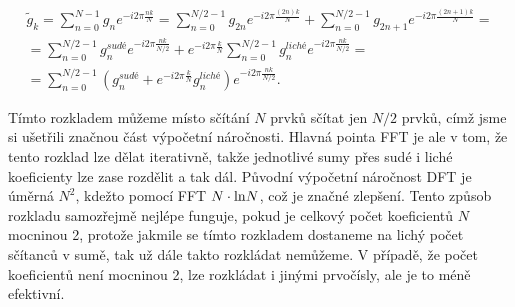 \begin{equation}
\begin{aligned}
\widetilde{g}_k = \sum_{n=0}^{N-1} g_n e^{-i 2 \pi \frac{n k}{N}} = \sum_{n=0}^{N/2-1} g_{2n} e^{-i 2 \pi \frac{(2n) k}{N}} + \sum_{n=0}^{N/2-1} g_{2n+1} e^{-i 2 \pi \frac{(2n+1) k}{N}} =\\
= \sum_{n=0}^{N/2-1} g_n^{sudé} e^{-i 2 \pi \frac{n k}{N/2}} + e^{-i 2 \pi \frac{k}{N}} \sum_{n=0}^{N/2-1} g_n^{liché} e^{-i 2 \pi \frac{n k}{N/2}} = \\
= \sum_{n=0}^{N/2-1} \left(g_n^{sudé} + e^{-i 2 \pi \frac{k}{N}} g_n^{liché}\right) e^{-i 2 \pi \frac{n k}{N/2}}.
\end{aligned}
\end{equation}

Tímto rozkladem můžeme místo sčítání $N$ prvků sčítat jen $N/2$ prvků, címž jsme si ušetřili značnou část výpočetní náročnosti. Hlavná pointa FFT je ale v tom, že tento rozklad lze dělat iterativně, takže jednotlivé sumy přes sudé i liché koeficienty lze zase rozdělit a tak dál. Původní výpočetní náročnost DFT je úměrná $N^2$, kdežto pomocí FFT $N\cdot {\rm ln} N$, což je značné zlepšení. Tento způsob rozkladu samozřejmě nejlépe funguje, pokud je celkový počet koeficientů $N$ mocninou 2, protože jakmile se tímto rozkladem dostaneme na lichý počet sčítanců v sumě, tak už dále takto rozkládat nemůžeme. V případě, že počet koeficientů není mocninou 2, lze rozkládat i jinými prvočísly, ale je to méně efektivní.



